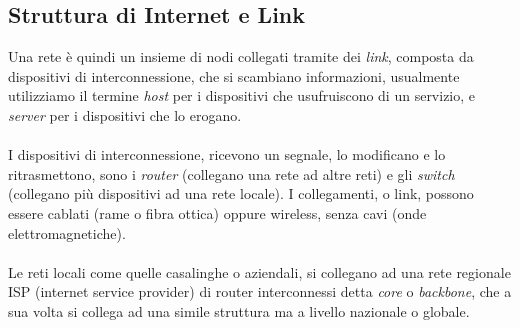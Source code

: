 \documentclass[12pt, letterpaper]{article}
\newcommand{\acc}{\\\hphantom{}\\}
\begin{document}
\subsection{Struttura di Internet e Link}
Una rete è quindi un insieme di nodi collegati tramite dei \textit{link}, composta da dispositivi di interconnessione, che
si scambiano informazioni, usualmente utilizziamo il termine \textit{host} per i dispositivi che usufruiscono di un servizio,
e \textit{server} per i dispositivi che lo erogano.\acc
I dispositivi di interconnessione, ricevono un segnale, lo modificano e lo ritrasmettono, sono i \textit{router} (collegano una
rete ad altre reti) e gli  \textit{switch} (collegano più dispositivi ad una rete locale). I collegamenti, o link, possono
essere cablati (rame o fibra ottica) oppure wireless, senza cavi (onde elettromagnetiche).\acc
Le reti locali come quelle casalinghe o aziendali, si collegano ad una rete regionale ISP (internet service provider) di router interconnessi detta
\textit{core} o \textit{backbone}, che a sua volta si collega ad una simile struttura ma a livello nazionale o globale.\acc
\end{document}
